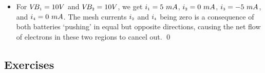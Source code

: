 \documentclass{ximera}
\begin{document}
\begin{ex}
\begin{itemize}
\item  For $V\!B_{\mbox{\tiny$1$}} = 10 V$ and $V\!B_{\mbox{\tiny$2$}} = 10 V$, we get $i_{\mbox{\tiny$1$}} = 5 \, \, mA$, $i_{\mbox{\tiny$2$}} = 0 \, \, mA$, $i_{\mbox{\tiny$3$}} = -5 \, \, mA$, and $i_{\mbox{\tiny$4$}} = 0 \, \, mA$.  The mesh currents $i_{\mbox{\tiny$2$}}$ and $i_{\mbox{\tiny$4$}}$ being zero is a consequence of both batteries `pushing' in equal but opposite directions, causing the net flow of electrons in these two regions to cancel out. \qed

\end{itemize}

\end{ex}

\subsection{Exercises}


\closegraphsfile
\end{document}
